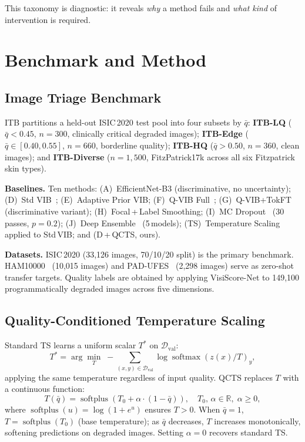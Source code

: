 \documentclass{bmvc2k}
\newcommand{\qbar}{\bar{q}}
\newcommand{\D}{\mathcal{D}}
\newcommand{\R}{\mathbb{R}}
\begin{document}
This taxonomy is diagnostic: it reveals \emph{why} a method fails and
\emph{what kind} of intervention is required.

\section{Benchmark and Method}
\label{sec:method}

\subsection{Image Triage Benchmark}
\label{sec:itb}

ITB partitions a held-out ISIC\,2020 test pool into four subsets by $\qbar$:
\textbf{ITB-LQ} ($\qbar{<}0.45$, $n{=}300$, clinically critical degraded
images); \textbf{ITB-Edge} ($\qbar{\in}[0.40,0.55]$, $n{=}660$, borderline
quality); \textbf{ITB-HQ} ($\qbar{>}0.50$, $n{=}360$, clean images); and
\textbf{ITB-Diverse} ($n{=}1{,}500$, FitzPatrick17k across all six Fitzpatrick
skin types).

\textbf{Baselines.} Ten methods: (A)~EfficientNet-B3 (discriminative,
no uncertainty); (D)~Std VIB~\cite{alemi2017vib}; (E)~Adaptive Prior VIB;
(F)~Q-VIB Full~\cite{anonymous2025qvib}; (G)~Q-VIB+TokFT (discriminative
variant); (H)~Focal\,+\,Label Smoothing; (I)~MC
Dropout~\cite{gal2016dropout} (30 passes, $p{=}0.2$); (J)~Deep Ensemble~\cite{lakshminarayanan2017ensemble}
(5\,models); (TS)~Temperature Scaling~\cite{guo2017calibration}
applied to Std\,VIB; and (D\,+\,QCTS, ours).

\textbf{Datasets.} ISIC\,2020 (33,126 images, 70/10/20 split) is the
primary benchmark. HAM10000~\cite{tschandl2019ham10000} (10,015 images) and
PAD-UFES~\cite{pacheco2020pad} (2,298 images) serve as zero-shot transfer
targets. Quality labels are obtained by applying VisiScore-Net to 149,100
programmatically degraded images across five dimensions.

\subsection{Quality-Conditioned Temperature Scaling}
\label{sec:qcts}

Standard TS learns a uniform scalar $T^*$ on $\D_\text{val}$:
\begin{equation}
T^* = \arg\min_{T} \;
  {-}\!\sum_{(x,y)\in\D_\text{val}}\!\log \operatorname{softmax}(z(x)/T)_y,
\label{eq:ts}
\end{equation}
applying the same temperature regardless of input quality. QCTS replaces $T$
with a continuous function:
\begin{equation}
T(\qbar) = \operatorname{softplus}(T_0 + \alpha\cdot(1-\qbar)), \quad
  T_0,\,\alpha\in\R,\;\alpha\geq 0,
\label{eq:qcts}
\end{equation}
where $\operatorname{softplus}(u){=}\log(1{+}e^u)$ ensures $T{>}0$. When
$\qbar{=}1$, $T{=}\operatorname{softplus}(T_0)$ (base temperature); as
$\qbar$ decreases, $T$ increases monotonically, softening predictions on
degraded images. Setting $\alpha{=}0$ recovers standard TS.
\end{document}
